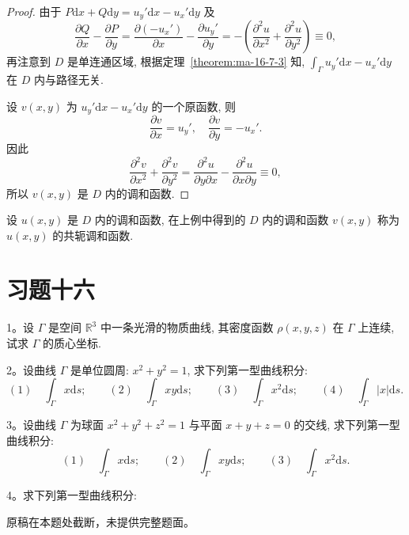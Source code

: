 \begin{proof}
由于 $P\mathrm dx+Q\mathrm dy=u_y'\mathrm dx-u_x'\mathrm dy$ 及
\[
  \frac{\partial Q}{\partial x}-\frac{\partial P}{\partial y}
  =
  \frac{\partial(-u_x')}{\partial x}-\frac{\partial u_y'}{\partial y}
  =
  -\left(\frac{\partial^2u}{\partial x^2}+\frac{\partial^2u}{\partial y^2}\right)
  \equiv0,
\]
再注意到 $D$ 是单连通区域, 根据定理~\ref{theorem:ma-16-7-3} 知, $\int_\Gamma u_y'\mathrm dx-u_x'\mathrm dy$ 在 $D$ 内与路径无关.

设 $v(x,y)$ 为 $u_y'\mathrm dx-u_x'\mathrm dy$ 的一个原函数, 则
\[
  \frac{\partial v}{\partial x}=u_y',
  \quad
  \frac{\partial v}{\partial y}=-u_x'.
\]
因此
\[
  \frac{\partial^2v}{\partial x^2}+\frac{\partial^2v}{\partial y^2}
  =
  \frac{\partial^2u}{\partial y\partial x}
  -
  \frac{\partial^2u}{\partial x\partial y}
  \equiv0,
\]
所以 $v(x,y)$ 是 $D$ 内的调和函数.
\end{proof}


\begin{remark}\label{remark:ma-16-source-83}
设 $u(x,y)$ 是 $D$ 内的调和函数, 在上例中得到的 $D$ 内的调和函数 $v(x,y)$ 称为 $u(x,y)$ 的共轭调和函数.
\end{remark}


\section*{习题十六}
{}
\label{exercises:ma-16}

1。设 $\Gamma$ 是空间 $\mathbb R^3$ 中一条光滑的物质曲线, 其密度函数 $\rho(x,y,z)$ 在 $\Gamma$ 上连续, 试求 $\Gamma$ 的质心坐标.

2。设曲线 $\Gamma$ 是单位圆周: $x^2+y^2=1$, 求下列第一型曲线积分:
\[
  (1)\quad \int_\Gamma x\mathrm ds;\qquad
  (2)\quad \int_\Gamma xy\mathrm ds;\qquad
  (3)\quad \int_\Gamma x^2\mathrm ds;\qquad
  (4)\quad \int_\Gamma |x|\mathrm ds.
\]

3。设曲线 $\Gamma$ 为球面 $x^2+y^2+z^2=1$ 与平面 $x+y+z=0$ 的交线, 求下列第一型曲线积分:
\[
  (1)\quad \int_\Gamma x\mathrm ds;\qquad
  (2)\quad \int_\Gamma xy\mathrm ds;\qquad
  (3)\quad \int_\Gamma x^2\mathrm ds.
\]

4。求下列第一型曲线积分:

\begin{remark}
原稿在本题处截断，未提供完整题面。
\end{remark}

